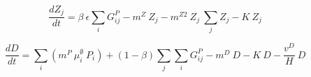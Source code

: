 \documentclass[template.tex]{subfiles}
\begin{document}
\begin{equation}
    \frac{d Z_j}{d t} =
    \beta \ \epsilon  \sum_{i} G_{ij}^P %
    - m^{Z} \ Z_j  %
    - m^{Z2} \ Z_j \ \sum_{j} Z_j  %
    - K \ Z_j %
\end{equation}

\begin{equation}
    \frac{d D}{d t} = 
    \sum_{i}(m^P  \ \mu_i^{\emptyset} \  P_i) %
    + (1 - \beta) \sum_{j} \sum_{i} G_{ij}^P %
    - m^D \ D %
    - K \ D %
    - \frac{v^D}{H} \ D %
\end{equation}

\clearpage
\end{document}
